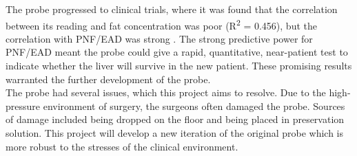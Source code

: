 The probe progressed to clinical trials, where it was found that the correlation between its reading and fat concentration was poor (R\textsuperscript{2} = 0.456), but the correlation with PNF/EAD was strong \cite{Robertson}. The strong predictive power for PNF/EAD meant the probe could give a rapid, quantitative, near-patient test to indicate whether the liver will survive in the new patient. These promising results warranted the further development of the probe.\\

The probe had several issues, which this project aims to resolve. Due to the high-pressure environment of surgery, the surgeons often damaged the probe. Sources of damage included being dropped on the floor and being placed in preservation solution. This project will develop a new iteration of the original probe which is more robust to the stresses of the clinical environment.




